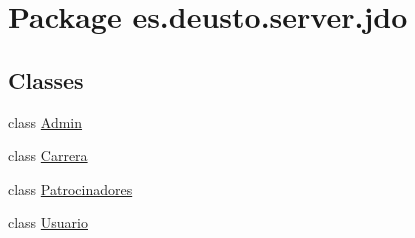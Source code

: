\hypertarget{namespacees_1_1deusto_1_1server_1_1jdo}{}\section{Package es.\+deusto.\+server.\+jdo}
\label{namespacees_1_1deusto_1_1server_1_1jdo}
\subsection*{Classes}
\begin{DoxyCompactItemize}
\item 
class \mbox{\hyperlink{classes_1_1deusto_1_1server_1_1jdo_1_1_admin}{Admin}}
\item 
class \mbox{\hyperlink{classes_1_1deusto_1_1server_1_1jdo_1_1_carrera}{Carrera}}
\item 
class \mbox{\hyperlink{classes_1_1deusto_1_1server_1_1jdo_1_1_patrocinadores}{Patrocinadores}}
\item 
class \mbox{\hyperlink{classes_1_1deusto_1_1server_1_1jdo_1_1_usuario}{Usuario}}
\end{DoxyCompactItemize}
